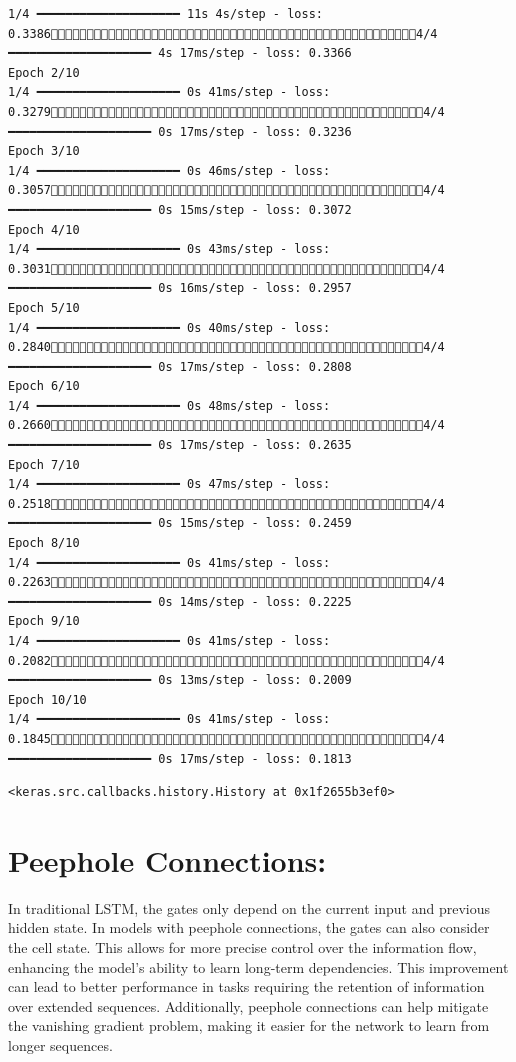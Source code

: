 \documentclass[
  letterpaper,
  DIV=11,
  numbers=noendperiod]{scrreprt}
\begin{document}
\begin{verbatim}
1/4 ━━━━━━━━━━━━━━━━━━━━ 11s 4s/step - loss: 0.33864/4 ━━━━━━━━━━━━━━━━━━━━ 4s 17ms/step - loss: 0.3366
Epoch 2/10
1/4 ━━━━━━━━━━━━━━━━━━━━ 0s 41ms/step - loss: 0.32794/4 ━━━━━━━━━━━━━━━━━━━━ 0s 17ms/step - loss: 0.3236
Epoch 3/10
1/4 ━━━━━━━━━━━━━━━━━━━━ 0s 46ms/step - loss: 0.30574/4 ━━━━━━━━━━━━━━━━━━━━ 0s 15ms/step - loss: 0.3072
Epoch 4/10
1/4 ━━━━━━━━━━━━━━━━━━━━ 0s 43ms/step - loss: 0.30314/4 ━━━━━━━━━━━━━━━━━━━━ 0s 16ms/step - loss: 0.2957
Epoch 5/10
1/4 ━━━━━━━━━━━━━━━━━━━━ 0s 40ms/step - loss: 0.28404/4 ━━━━━━━━━━━━━━━━━━━━ 0s 17ms/step - loss: 0.2808
Epoch 6/10
1/4 ━━━━━━━━━━━━━━━━━━━━ 0s 48ms/step - loss: 0.26604/4 ━━━━━━━━━━━━━━━━━━━━ 0s 17ms/step - loss: 0.2635
Epoch 7/10
1/4 ━━━━━━━━━━━━━━━━━━━━ 0s 47ms/step - loss: 0.25184/4 ━━━━━━━━━━━━━━━━━━━━ 0s 15ms/step - loss: 0.2459
Epoch 8/10
1/4 ━━━━━━━━━━━━━━━━━━━━ 0s 41ms/step - loss: 0.22634/4 ━━━━━━━━━━━━━━━━━━━━ 0s 14ms/step - loss: 0.2225
Epoch 9/10
1/4 ━━━━━━━━━━━━━━━━━━━━ 0s 41ms/step - loss: 0.20824/4 ━━━━━━━━━━━━━━━━━━━━ 0s 13ms/step - loss: 0.2009
Epoch 10/10
1/4 ━━━━━━━━━━━━━━━━━━━━ 0s 41ms/step - loss: 0.18454/4 ━━━━━━━━━━━━━━━━━━━━ 0s 17ms/step - loss: 0.1813
\end{verbatim}

\begin{verbatim}
<keras.src.callbacks.history.History at 0x1f2655b3ef0>
\end{verbatim}

\section{Peephole Connections:}\label{peephole-connections}

In traditional LSTM, the gates only depend on the current input and
previous hidden state. In models with peephole connections, the gates
can also consider the cell state. This allows for more precise control
over the information flow, enhancing the model's ability to learn
long-term dependencies. This improvement can lead to better performance
in tasks requiring the retention of information over extended sequences.
Additionally, peephole connections can help mitigate the vanishing
gradient problem, making it easier for the network to learn from longer
sequences.
\end{document}
